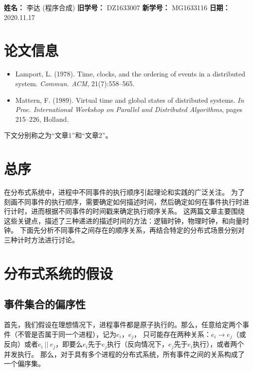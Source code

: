 \documentclass[UTF8]{article}
\begin{document}
    
{\flushleft \bf \Large 姓名：} 李达 (程序合成)
{\flushleft \bf \Large 旧学号：} DZ1633007
{\flushleft \bf \Large 新学号：} MG1633116
{\flushleft \bf \Large 日期：} 2020.11.17

\section*{论文信息}
\begin{itemize}
    \item Lamport, L. (1978). Time, clocks, and the ordering of events in a distributed system. 
    \textit{Commun. ACM}, 21(7):558–565.
    \item Mattern, F. (1989). Virtual time and global states of distributed systems. 
    \textit{In Proc. International Workshop on Parallel and Distributed Algorithms}, pages 215–226, Holland.
\end{itemize}
下文分别称之为“文章1”和“文章2”。
    
\section{总序}

在分布式系统中，进程中不同事件的执行顺序引起理论和实践的广泛关注。
为了刻画不同事件的执行顺序，需要确定如何描述时间，然后确定如何在事件执行时进行计时，进而根据不同事件的时间戳来确定执行顺序关系。
这两篇文章主要围绕这些关键点，描述了三种递进的描述时间的方法：逻辑时钟，物理时钟，和向量时钟。
下面先分析不同事件之间存在的顺序关系，再结合特定的分布式场景分别对三种计时方法进行讨论。

\section{分布式系统的假设}

\subsection{事件集合的偏序性}
首先，我们假设在理想情况下，进程事件都是原子执行的。那么，任意给定两个事件（不管是否属于同一个进程），记为$e_i$，$e_j$，
只可能存在两种关系：$e_i \rightarrow e_j$（或反向）或者$e_i\ ||\ e_j$，即要么$e_i$先于$e_j$执行（反向情况下，$e_j$先于$e_i$执行），或者两个并发执行。
那么，对于具有多个进程的分布式系统，所有事件之间的关系构成了一个偏序集。
\end{document}
